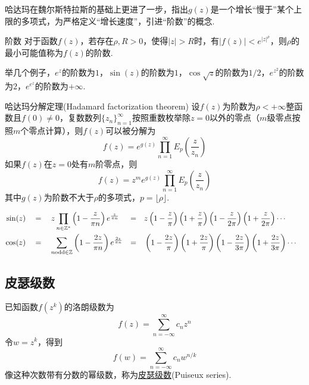 \documentclass[main.tex]{subfiles}
\begin{document}
哈达玛在魏尔斯特拉斯的基础上更进了一步，指出\(g(z)\)是一个增长“慢于”某个上限的多项式，为严格定义“增长速度”，引进“阶数”的概念.

\begin{definition}{阶数}
    对于函数\(f(z)\)，若存在\(\rho,R>0\)，使得\(|z|>R\)时，有\(|f(z)|<e^{|z|^{\rho}}\)，则\(\rho\)的最小可能值称为\(f(z)\)的阶数.
\end{definition}

举几个例子，\(e^z\)的阶数为\(1\)，\(\sin(z)\)的阶数为\(1\)，\(\cos\sqrt z\)的阶数为\(1/2\)，\(e^{z^2}\)的阶数为\(2\)，\(e^{e^z}\)的阶数为\(+\infty\).

\begin{theorem}{哈达玛分解定理(Hadamard factorization theorem)}
    设\(f(z)\)为阶数为\(\rho<+\infty\)整函数且\(f(0)\neq 0\)，复数数列\(\{z_n\}_{n=1}^{\infty}\)按照重数枚举除\(z=0\)以外的零点（\(m\)级零点按照\(m\)个零点计算），则\(f(z)\)可以被分解为
    \[f(z) = e^{g(z)}\prod_{n=1}^{\infty}E_{p}\left(\frac{z}{z_n}\right)\]
    如果\(f(z)\)在\(z=0\)处有\(m\)阶零点，则
    \[f(z) = z^me^{g(z)}\prod_{n=1}^{\infty}E_{p}\left(\frac{z}{z_n}\right)\]
    其中\(g(z)\)为阶数不大于\(\rho\)的多项式，\(p=\lfloor \rho \rfloor\).
\end{theorem}

\begin{align*}
    \sin(z) \quad&=\quad z\prod_{n \in \mathbb{Z}^*}\left(1-\frac{z}{\pi n}\right)e^{\frac{z}{\pi n}} &=&\quad z \left(1-\frac{z}{\pi}\right)\left(1+\frac{z}{\pi}\right)\left(1-\frac{z}{2\pi}\right)\left(1+\frac{z}{2\pi}\right)\cdots & \\
    \cos(z) \quad&=\quad \sum_{n {\rm odd} \in \mathbb{Z}}\left(1-\frac{2z}{\pi n}\right)e^{\frac{2z}{\pi n}} &=&\quad \left(1-\frac{2z}{\pi}\right)\left(1+\frac{2z}{\pi}\right)\left(1-\frac{2z}{3\pi}\right)\left(1+\frac{2z}{3\pi}\right)\cdots & \\
\end{align*}

\subsection{皮瑟级数}

已知函数\(f(z^k)\)的洛朗级数为
\[f(z) = \sum_{n=-\infty}^{\infty} c_nz^{n}\]
令\(w=z^k\)，得到
\[f(w) = \sum_{n=-\infty}^{\infty} c_nw^{n/k}\]
像这种次数带有分数的幂级数，称为\uline{皮瑟级数}(Puiseux series).
\end{document}
